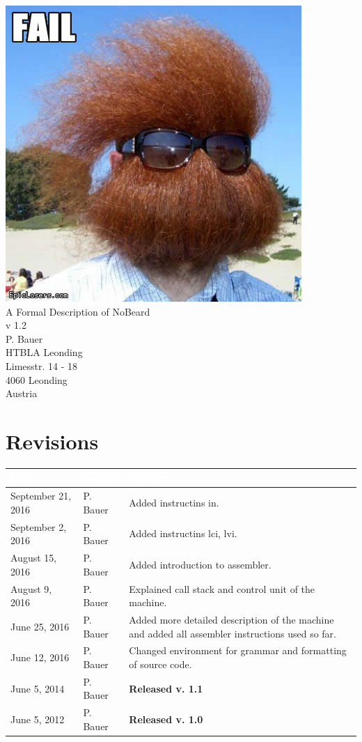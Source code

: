 \documentclass[11pt]{report}
\newcommand{\leongage}{NoBeard}
\begin{document}
\begin{titlepage}
\begin{center}
\includegraphics[scale=0.3]{no_beard_1.jpg} \\[2em]
{\Huge A Formal Description of \leongage} \\[1em]
{\large v 1.2} \\[2em]
{\Large P. Bauer} \\[1em]
HTBLA Leonding \\
Limesstr. 14 - 18 \\
4060 Leonding \\
Austria
\end{center}
\end{titlepage}

\section*{Revisions}
\begin{tabular}{|l|l|p{}|}
\hline
\cellcolor{Gray}\textcolor{White}{Date} & \cellcolor{Gray}\textcolor{White}{Author} & \cellcolor{Gray}\textcolor{White}{Change} \\ \hline
September 21, 2016 & P. Bauer & Added instructins in.  \\ \hline
September 2, 2016 & P. Bauer & Added instructins lci, lvi.  \\ \hline
August 15, 2016 & P. Bauer & Added introduction to assembler.  \\ \hline
August 9, 2016 & P. Bauer & Explained call stack and control unit of the machine.  \\ \hline
June 25, 2016 & P. Bauer & Added more detailed description of the machine and added all assembler instructions used so far.  \\ \hline
June 12, 2016 & P. Bauer & Changed environment for grammar and formatting of source code. \\ \hline
June 5, 2014 & P. Bauer & {\bf Released v. 1.1}  \\ \hline
June 5, 2012 & P. Bauer & {\bf Released v. 1.0}  \\ \hline
\end{tabular}
\end{document}
